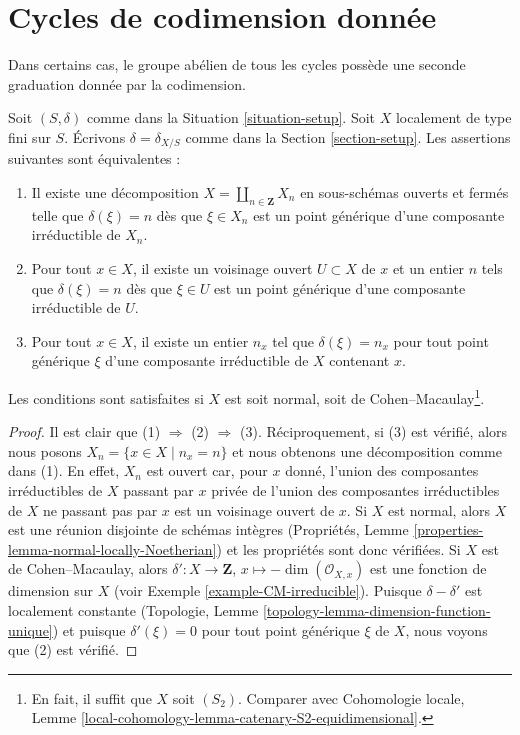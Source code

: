 \section{Cycles de codimension donnée}
\label{section-cycles-codimension}

\noindent
Dans certains cas, le groupe abélien de tous les cycles possède une seconde
graduation donnée par la codimension.

\begin{lemma}
\label{lemma-locally-equidimensional}
Soit $(S, \delta)$ comme dans la Situation \ref{situation-setup}.
Soit $X$ localement de type fini sur $S$. Écrivons
$\delta = \delta_{X/S}$ comme dans la Section \ref{section-setup}.
Les assertions suivantes sont équivalentes :
\begin{enumerate}
\item Il existe une décomposition $X = \coprod_{n \in \mathbf{Z}} X_n$
en sous-schémas ouverts et fermés telle que $\delta(\xi) = n$ dès que
$\xi \in X_n$ est un point générique d'une composante irréductible de $X_n$.
\item Pour tout $x \in X$, il existe un voisinage ouvert $U \subset X$
de $x$ et un entier $n$ tels que $\delta(\xi) = n$ dès que
$\xi \in U$ est un point générique d'une composante irréductible de $U$.
\item Pour tout $x \in X$, il existe un entier $n_x$ tel que
$\delta(\xi) = n_x$ pour tout point générique $\xi$ d'une composante
irréductible de $X$ contenant $x$.
\end{enumerate}
Les conditions sont satisfaites si $X$ est soit
normal, soit de Cohen--Macaulay\footnote{En fait, il suffit que
$X$ soit $(S_2)$. Comparer avec Cohomologie locale, Lemme
\ref{local-cohomology-lemma-catenary-S2-equidimensional}.}.
\end{lemma}

\begin{proof}
Il est clair que (1) $\Rightarrow$ (2) $\Rightarrow$ (3).
Réciproquement, si (3) est vérifié, alors nous posons $X_n = \{x \in X \mid n_x = n\}$
et nous obtenons une décomposition comme dans (1). En effet, $X_n$ est ouvert car,
pour $x$ donné, l'union des composantes irréductibles de $X$ passant par $x$
privée de l'union des composantes irréductibles de $X$ ne passant pas par $x$
est un voisinage ouvert de $x$. Si $X$ est normal, alors $X$ est une
réunion disjointe de schémas intègres
(Propriétés, Lemme \ref{properties-lemma-normal-locally-Noetherian})
et les propriétés sont donc vérifiées.
Si $X$ est de Cohen--Macaulay, alors
$\delta' : X \to \mathbf{Z}$, $x \mapsto -\dim(\mathcal{O}_{X, x})$
est une fonction de dimension sur $X$ (voir Exemple \ref{example-CM-irreducible}).
Puisque $\delta - \delta'$ est localement constante
(Topologie, Lemme \ref{topology-lemma-dimension-function-unique})
et puisque $\delta'(\xi) = 0$ pour tout point générique $\xi$ de $X$,
nous voyons que (2) est vérifié.
\end{proof}

